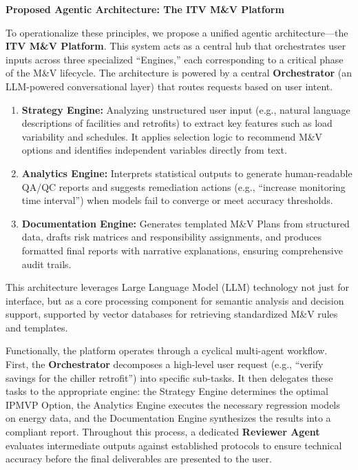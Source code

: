 \documentclass[11pt,a4paper]{article}
\begin{document}
\textbf{Proposed Agentic Architecture: The ITV M\&V Platform}

To operationalize these principles, we propose a unified agentic architecture---the \textbf{ITV M\&V Platform}. This system acts as a central hub that orchestrates user inputs across three specialized ``Engines,'' each corresponding to a critical phase of the M\&V lifecycle. The architecture is powered by a central \textbf{Orchestrator} (an LLM-powered conversational layer) that routes requests based on user intent.

\begin{enumerate}
    \item \textbf{Strategy Engine:} Analyzing unstructured user input (e.g., natural language descriptions of facilities and retrofits) to extract key features such as load variability and schedules. It applies selection logic to recommend M\&V options and identifies independent variables directly from text.
    \item \textbf{Analytics Engine:} Interprets statistical outputs to generate human-readable QA/QC reports and suggests remediation actions (e.g., ``increase monitoring time interval'') when models fail to converge or meet accuracy thresholds.
    \item \textbf{Documentation Engine:} Generates templated M\&V Plans from structured data, drafts risk matrices and responsibility assignments, and produces formatted final reports with narrative explanations, ensuring comprehensive audit trails.
\end{enumerate}

This architecture leverages Large Language Model (LLM) technology not just for interface, but as a core processing component for semantic analysis and decision support, supported by vector databases for retrieving standardized M\&V rules and templates.

Functionally, the platform operates through a cyclical multi-agent workflow. First, the \textbf{Orchestrator} decomposes a high-level user request (e.g., ``verify savings for the chiller retrofit'') into specific sub-tasks. It then delegates these tasks to the appropriate engine: the Strategy Engine determines the optimal IPMVP Option, the Analytics Engine executes the necessary regression models on energy data, and the Documentation Engine synthesizes the results into a compliant report. Throughout this process, a dedicated \textbf{Reviewer Agent} evaluates intermediate outputs against established protocols to ensure technical accuracy before the final deliverables are presented to the user.
\end{document}
